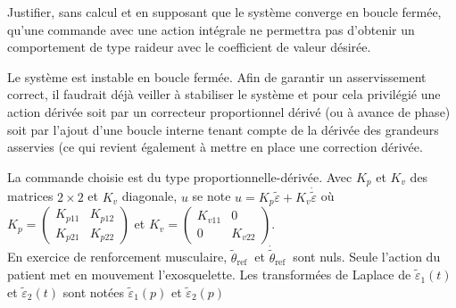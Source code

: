 \begin{question}
\label{2023_ccs_psi_q_25}
Justifier, sans calcul et en supposant que le système converge en boucle fermée, qu'une commande avec une action intégrale ne permettra pas d'obtenir un comportement de type raideur avec le coefficient de valeur désirée.
\end{question}
\ifprof
\begin{corrige}
Le système est instable en boucle fermée. Afin de garantir un asservissement correct, il faudrait déjà veiller à stabiliser le système et pour cela privilégié une action dérivée soit par un correcteur proportionnel dérivé (ou à avance de phase) soit par l'ajout d'une boucle interne tenant compte de la dérivée des grandeurs asservies (ce qui revient également à mettre en place une correction dérivée.
\end{corrige}
\else
\fi


La commande choisie est du type proportionnelle-dérivée. Avec $K_{p}$ et $K_{v}$ des matrices $2 \times 2$ et $K_{v}$ diagonale, $u$ se note $u=K_{p} \tilde{\varepsilon}+K_{v} \dot{\tilde{\varepsilon}}$ où $K_{p}=\left(\begin{array}{cc}K_{p 11} & K_{p 12} \\ K_{p 21} & K_{p 22}\end{array}\right)$ et $K_{v}=\left(\begin{array}{cc}K_{v 11} & 0 \\ 0 & K_{v 22}\end{array}\right)$.\\
En exercice de renforcement musculaire, $\tilde{\theta}_{\text {ref }}$ et $\dot{\tilde{\theta}}_{\text {ref }}$ sont nuls. Seule l'action du patient met en mouvement l'exosquelette. Les transformées de Laplace de $\tilde{\varepsilon}_{1}(t)$ et $\tilde{\varepsilon}_{2}(t)$ sont notées $\tilde{\varepsilon}_{1}(p)$ et $\tilde{\varepsilon}_{2}(p)$\\

